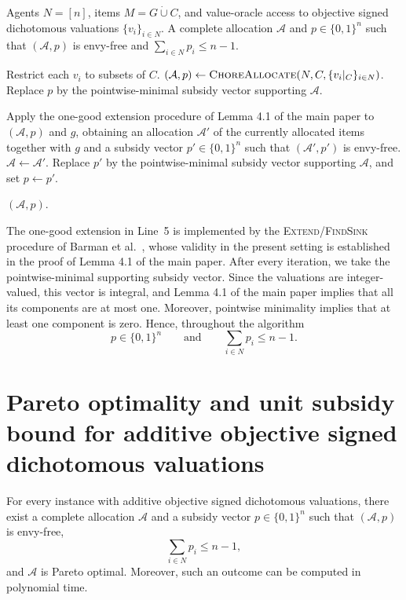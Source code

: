 \documentclass[sigconf,anonymous,nonacm]{aamas}
\newcommand{\alloc}{\mathcal{A}}
\begin{document}
\begin{algorithm}[H]
\caption{Unit subsidies for objective signed dichotomous valuations}
\label{alg:objective-mixed}
\begin{algorithmic}[1]
\Require Agents $N=[n]$, items $M=G\mathbin{\dot\cup}C$, and value-oracle access to objective signed dichotomous valuations $\{v_i\}_{i\in N}$.
\Ensure A complete allocation $\alloc$ and $p\in\{0,1\}^n$ such that $(\alloc,p)$ is envy-free and $\sum_{i\in N}p_i\le n-1$.

\State Restrict each $v_i$ to subsets of $C$.
\State $(\alloc,p)\gets\textsc{ChoreAllocate}(N,C,\{v_i|_C\}_{i\in N})$.
\State Replace $p$ by the pointwise-minimal subsidy vector supporting $\alloc$.

    \State Apply the one-good extension procedure of  Lemma 4.1 of the main paper to $(\alloc,p)$ and $g$, obtaining an allocation $\alloc'$ of the currently allocated items together with $g$ and a subsidy vector $p'\in\{0,1\}^n$ such that $(\alloc',p')$ is envy-free.
    \State $\alloc\gets\alloc'$.
    \State Replace $p'$ by the pointwise-minimal subsidy vector supporting $\alloc$, and set $p\gets p'$.
\EndFor

\State \Return $(\alloc,p)$.
\end{algorithmic}
\end{algorithm}

The one-good extension in Line~5 is implemented by the \textsc{Extend}/\textsc{FindSink} procedure of Barman et al.~\cite{BKNS22}, whose validity in the present setting is established in the proof of Lemma 4.1 of the main paper. After every iteration, we take the pointwise-minimal supporting subsidy vector. Since the valuations are integer-valued, this vector is integral, and Lemma 4.1 of the main paper implies that all its components are at most one. Moreover, pointwise minimality implies that at least one component is zero. Hence, throughout the algorithm
\[
p\in\{0,1\}^n
\qquad\text{and}\qquad
\sum_{i\in N}p_i\le n-1.
\]

\section{Pareto optimality and unit subsidy bound for additive objective signed dichotomous valuations}
\begin{proposition}
\label{prop:additive-objective-po-supp}
For every instance with additive objective signed dichotomous valuations, there exist a complete allocation $\alloc$ and a subsidy vector $p\in\{0,1\}^n$ such that $(\alloc,p)$ is envy-free,
\[
\sum_{i\in N}p_i\leq n-1,
\]
and $\alloc$ is Pareto optimal. Moreover, such an outcome can be computed in polynomial time.
\end{proposition}
\end{document}
